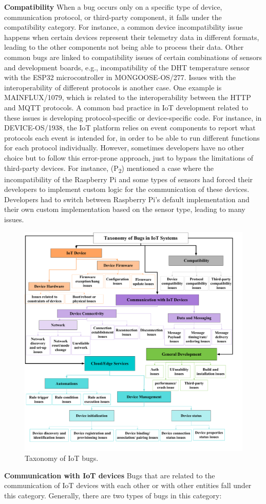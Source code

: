 \textbf{Compatibility}
When a bug occurs only on a specific type of device, communication protocol, or third-party component, it falls under the compatibility category. For instance, a common device incompatibility issue happens when certain devices represent their telemetry data in different formats, leading to the other components not being able to process their data. Other common bugs are linked to compatibility issues of certain combinations of sensors and development boards, e.g., incompatibility of the DHT temperature sensor with the ESP32 microcontroller in MONGOOSE-OS/277. Issues with the interoperability of different protocols is another case. One example is MAINFLUX/1079, which is related to the interoperability between the HTTP and MQTT protocols. A common bad practice in IoT development related to these issues is developing protocol-specific or device-specific code. For instance, in DEVICE-OS/1938, the IoT platform relies on event components to report what protocols each event is intended for, in order to be able to run different functions for each protocol individually. However, sometimes developers have no other choice but to follow this error-prone approach, just to bypass the limitations of third-party devices. For instance, (P\textsubscript{2}) mentioned a case where the incompatibility of the Raspberry Pi and some types of sensors had forced their developers to implement custom logic for the communication of these devices. Developers had to switch between Raspberry Pi's default implementation and their own custom implementation based on the sensor type, leading to many issues.
\begin{figure}%
  \centering
   \includegraphics[width=\linewidth]{imgs/tax.pdf}
  \caption{Taxonomy of IoT bugs.} 
  \label{bugTax}
\end{figure}
\textbf{Communication with IoT devices}
Bugs that are related to the communication of IoT devices with each other or with other entities fall under this category. Generally, there are two types of bugs in this category:

